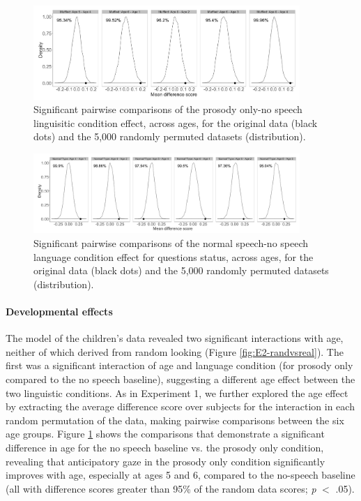\documentclass[authoryear, 12pt]{elsarticle}
\begin{document}
\begin{figure}[h!]
\begin{center}
\includegraphics[width=0.9\textwidth]{figures/E2-child-randvsreal-ttest-muffledages.png}
\end{center}
\caption{Significant pairwise comparisons of the prosody only-no speech linguisitic condition effect, across ages, for the original data (black dots) and the 5,000 randomly permuted datasets (distribution).} 
\label{fig:E2-lgageinteraction}
\end{figure}

\begin{figure}[h!]
\begin{center}
\includegraphics[width=0.9\textwidth]{figures/E2-child-randvsreal-ttest-normaltypesages.png}
\end{center}
\caption{Significant pairwise comparisons of the normal speech-no speech language condition effect for questions status, across ages, for the original data (black dots) and the 5,000 randomly permuted datasets (distribution).} 
\label{fig:E2-lgagetypeinteraction}
\end{figure}

\paragraph{Developmental effects}
The model of the children's data revealed two significant interactions with age, neither of which derived from random looking (Figure \ref{fig:E2-randvsreal}). The first was a significant interaction of age and language condition (for prosody only compared to the no speech baseline), suggesting a different age effect between the two linguistic conditions. As in Experiment 1, we further explored the age effect by extracting the average difference score over subjects for the interaction in each random permutation of the data, making pairwise comparisons between the six age groups. Figure \ref{fig:E2-lgageinteraction} shows the comparisons that demonstrate a significant difference in age for the no speech baseline vs. the prosody only condition, revealing that anticipatory gaze in the prosody only condition significantly improves with age, especially at ages 5 and 6, compared to the no-speech baseline (all with difference scores greater than 95\% of the random data scores; \textit{p} $<$ .05).
\end{document}
